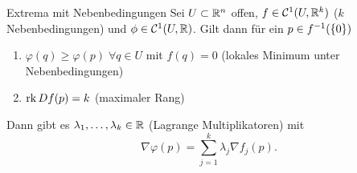 \documentclass[main.tex]{subfiles}
\begin{document}
\begin{karte}{Extrema mit Nebenbedingungen}
    Sei \( U \subset \mathbb{R}^n \) offen, \( f \in \mathcal{C}^1(U, \mathbb{R}^k) \) 
    (\(k\) Nebenbedingungen) und \(\phi \in \mathcal{C}^1(U, \mathbb{R})\).
    Gilt dann für ein \(p \in f^{-1}(\{0\})\)
    \begin{enumerate}
        \item \( \varphi(q) \geq \varphi(p) \;\forall q \in U \) mit
        \( f(q) = 0 \) (lokales Minimum unter Nebenbedingungen)
        \item \( \operatorname{rk} Df (p) = k \) (maximaler Rang)
    \end{enumerate}
    Dann gibt es \( \lambda_1, \ldots, \lambda_k \in \mathbb{R} \) (Lagrange Multiplikatoren)
    mit 
    \[ \nabla \varphi(p) = \sum_{j=1}^k \lambda_j \nabla f_j(p). \]
\end{karte}
\end{document}
